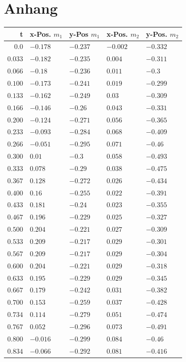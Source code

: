 \section{Anhang}
\nopagebreak

\begin{table}[h]
\scriptsize
\centering
\begin{tabular}{rllll}
t & x-Pos. $m_1$ & y-Pos $m_1$ & x-Pos. $m_2$ & y-Pos. $m_2$ \\
\toprule
$0.0$&$-0.178$&$-0.237$&$-0.002$&$-0.332$\\
$0.033$&$-0.182$&$-0.235$&$0.004$&$-0.311$\\
$0.066$&$-0.18$&$-0.236$&$0.011$&$-0.3$\\
$0.100$&$-0.173$&$-0.241$&$0.019$&$-0.299$\\
$0.133$&$-0.162$&$-0.249$&$0.03$&$-0.309$\\
$0.166$&$-0.146$&$-0.26$&$0.043$&$-0.331$\\
$0.200$&$-0.124$&$-0.271$&$0.056$&$-0.365$\\
$0.233$&$-0.093$&$-0.284$&$0.068$&$-0.409$\\
$0.266$&$-0.051$&$-0.295$&$0.071$&$-0.46$\\
$0.300$&$0.01$&$-0.3$&$0.058$&$-0.493$\\
$0.333$&$0.078$&$-0.29$&$0.038$&$-0.475$\\
$0.367$&$0.128$&$-0.272$&$0.026$&$-0.434$\\
$0.400$&$0.16$&$-0.255$&$0.022$&$-0.391$\\
$0.433$&$0.181$&$-0.24$&$0.023$&$-0.355$\\
$0.467$&$0.196$&$-0.229$&$0.025$&$-0.327$\\
$0.500$&$0.204$&$-0.221$&$0.027$&$-0.309$\\
$0.533$&$0.209$&$-0.217$&$0.029$&$-0.301$\\
$0.567$&$0.209$&$-0.217$&$0.029$&$-0.304$\\
$0.600$&$0.204$&$-0.221$&$0.029$&$-0.318$\\
$0.633$&$0.195$&$-0.229$&$0.029$&$-0.345$\\
$0.667$&$0.179$&$-0.242$&$0.031$&$-0.382$\\
$0.700$&$0.153$&$-0.259$&$0.037$&$-0.428$\\
$0.734$&$0.114$&$-0.279$&$0.051$&$-0.474$\\
$0.767$&$0.052$&$-0.296$&$0.073$&$-0.491$\\
$0.800$&$-0.016$&$-0.299$&$0.084$&$-0.46$\\
$0.834$&$-0.066$&$-0.292$&$0.081$&$-0.416$\\

\end{tabular}
\end{table}
